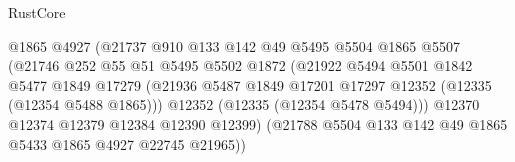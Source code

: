 \begin{lexlean}{RustCore}
\begin{coremodule}
                                        @1865
                                        @4927
                                        (@21737
                                          @910
                                          @133
                                          @142
                                          @49
                                          @5495
                                          @5504
                                          @1865
                                          @5507
                                          (@21746
                                            @252
                                            @55
                                            @51
                                            @5495
                                            @5502
                                            @1872
                                            (@21922
                                              @5494
                                              @5501
                                              @1842
                                              @5477
                                              @1849
                                              @17279
                                              (@21936
                                                @5487
                                                @1849
                                                @17201
                                                @17297
                                                @12352
                                                (@12335 (@12354 @5488 @1865)))
                                              @12352
                                              (@12335 (@12354 @5478 @5494)))
                                            @12370
                                            @12374
                                            @12379
                                            @12384
                                            @12390
                                            @12399)
                                          (@21788
                                            @5504
                                            @133
                                            @142
                                            @49
                                            @1865
                                            @5433
                                            @1865
                                            @4927
                                            @22745
                                            @21965))

\end{coremodule}
\end{lexlean}
